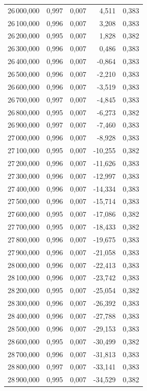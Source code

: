 \begin{longtable}{rrrrr}
26\,000,000 & 0,997 & 0,007 & 4,511 & 0,383\\
26\,100,000 & 0,996 & 0,007 & 3,208 & 0,383\\
26\,200,000 & 0,995 & 0,007 & 1,828 & 0,382\\
26\,300,000 & 0,996 & 0,007 & 0,486 & 0,383\\
26\,400,000 & 0,996 & 0,007 & -0,864 & 0,383\\
26\,500,000 & 0,996 & 0,007 & -2,210 & 0,383\\
26\,600,000 & 0,996 & 0,007 & -3,519 & 0,383\\
26\,700,000 & 0,997 & 0,007 & -4,845 & 0,383\\
26\,800,000 & 0,995 & 0,007 & -6,273 & 0,382\\
26\,900,000 & 0,997 & 0,007 & -7,460 & 0,383\\
27\,000,000 & 0,996 & 0,007 & -8,928 & 0,383\\
27\,100,000 & 0,995 & 0,007 & -10,255 & 0,382\\
27\,200,000 & 0,996 & 0,007 & -11,626 & 0,383\\
27\,300,000 & 0,996 & 0,007 & -12,997 & 0,383\\
27\,400,000 & 0,996 & 0,007 & -14,334 & 0,383\\
27\,500,000 & 0,996 & 0,007 & -15,714 & 0,383\\
27\,600,000 & 0,995 & 0,007 & -17,086 & 0,382\\
27\,700,000 & 0,995 & 0,007 & -18,433 & 0,382\\
27\,800,000 & 0,996 & 0,007 & -19,675 & 0,383\\
27\,900,000 & 0,996 & 0,007 & -21,058 & 0,383\\
28\,000,000 & 0,996 & 0,007 & -22,413 & 0,383\\
28\,100,000 & 0,996 & 0,007 & -23,742 & 0,383\\
28\,200,000 & 0,995 & 0,007 & -25,054 & 0,382\\
28\,300,000 & 0,996 & 0,007 & -26,392 & 0,383\\
28\,400,000 & 0,996 & 0,007 & -27,788 & 0,383\\
28\,500,000 & 0,996 & 0,007 & -29,153 & 0,383\\
28\,600,000 & 0,995 & 0,007 & -30,499 & 0,382\\
28\,700,000 & 0,996 & 0,007 & -31,813 & 0,383\\
28\,800,000 & 0,997 & 0,007 & -33,141 & 0,383\\
28\,900,000 & 0,995 & 0,007 & -34,529 & 0,382\\

\end{longtable}
